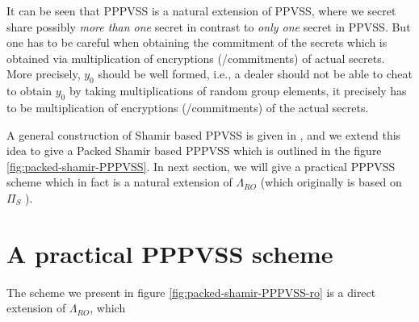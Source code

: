 It can be seen that PPPVSS is a natural extension of PPVSS, where we secret share possibly \textit{more than one} 
secret in contrast to \textit{only one} secret in PPVSS. But one has to be careful when obtaining the commitment 
of the secrets which is obtained via multiplication of encryptions (/commitments) of actual secrets. 
More precisely, $y_0$ should be well formed, i.e., a dealer should not be able to cheat to obtain $y_0$ by 
taking multiplications of random group elements, it precisely has to be multiplication of encryptions 
(/commitments) of the actual secrets.\par 

A general construction of Shamir based PPVSS is given in \cite{cryptoeprint:2025/576}, and we extend this idea 
to give a Packed Shamir based PPPVSS which is outlined in the figure \ref{fig:packed-shamir-PPPVSS}. In next section, we will give a practical PPPVSS scheme which in fact 
is a natural extension of $\Lambda_{RO}$ \cite{cryptoeprint:2025/576} (which originally is based on $\Pi_S$ \cite{cryptoeprint:2023/1669}).



\section{A practical PPPVSS scheme}

The scheme we present in figure \ref{fig:packed-shamir-PPPVSS-ro} is a direct extension of $\Lambda_{RO}$, which 



 


